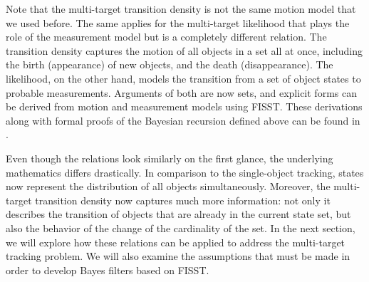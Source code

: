 Note that the multi-target transition density is not the same motion model that we used before. The same applies for the multi-target likelihood that plays the role of the measurement model but is a completely different relation. The transition density captures the motion of all objects in a set all at once, including the birth (appearance) of new objects, and the death (disappearance). The likelihood, on the other hand, models the transition from a set of object states to probable measurements. Arguments of both are now sets, and explicit forms can be derived from motion and measurement models using FISST. These derivations along with formal proofs of the Bayesian recursion defined above can be found in \cite{mahlerMultitargetBayesFiltering2003}.

Even though the relations look similarly on the first glance, the underlying mathematics differs drastically. In comparison to the single-object tracking, states now represent the distribution of all objects simultaneously. Moreover, the multi-target transition density now captures much more information: not only it describes the transition of objects that are already in the current state set, but also the behavior of the change of the cardinality of the set. In the next section, we will explore how these relations can be applied to address the multi-target tracking problem. We will also examine the assumptions that must be made in order to develop Bayes filters based on FISST.
